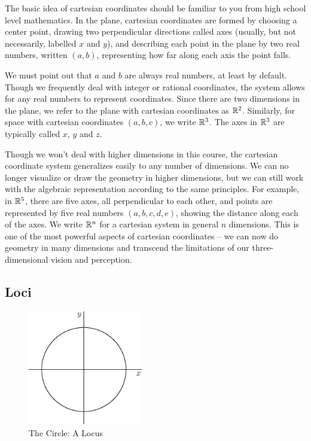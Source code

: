 \documentclass[fleqn]{report}
\begin{document}
The basic idea of cartesian coordinates should be familiar to
you from high school level mathematics. In the plane, 
cartesian coordinates are formed by choosing
a center point, drawing two perpendicular directions called axes
(usually, but not necessarily, labelled $x$ and $y$), and
describing each point in the plane by two real numbers, written
$(a,b)$, representing how far along each axis the point falls.

We must point out that $a$ and $b$ are always real numbers, at
least by default. Though we frequently deal with integer or
rational coordinates, the system allows for any real numbers to
represent coordinates. Since there are two dimensions in the
plane, we refer to the plane with cartesian coordinates as
$\mathbb{R}^2$. Similarly, for space with cartesian coordinates
$(a,b,c)$, we write $\mathbb{R}^3$. The axes in $\mathbb{R}^3$ are typically called
$x$, $y$ and $z$. 

Though we won't deal with higher dimensions in this course, the
cartesian coordinate system generalizes easily to any number
of dimensions. We can no longer visualize or draw the
geometry in higher dimensions, but we can still work with the
algebraic representation according to the same principles.
For example, in $\mathbb{R}^5$, there are five axes, all
perpendicular to each other, and points are represented by
five real numbers $(a,b,c,d,e)$, showing the distance along
each of the axes. We write $\mathbb{R}^n$ for a cartesian system in
general $n$ dimensions. This is one of the most powerful
aspects of cartesian coordinates -- we can now do geometry in
many dimensions and transcend the limitations of our
three-dimensional vision and perception.

\subsection{Loci}
\label{loci}

\begin{figure}[t]
\centering
\includegraphics[width=5cm]{figure64.eps}
\caption{The Circle: A Locus}
\label{figure-circle}
\end{figure}
\end{document}
